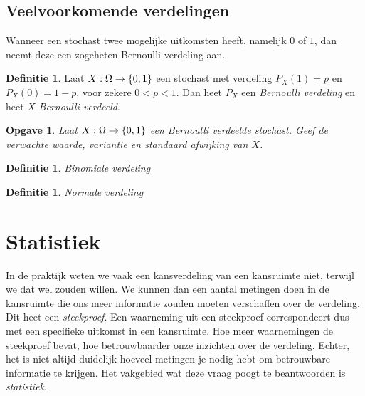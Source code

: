 \documentclass[a4paper]{book}
\newtheorem{exercise}[theorem]{Opgave}
\theoremstyle{definition}
\newtheorem{definition}[theorem]{Definitie}
\begin{document}
\section{Veelvoorkomende verdelingen}
Wanneer een stochast twee mogelijke uitkomsten heeft, namelijk $0$ of $1$, dan neemt deze een zogeheten Bernoulli verdeling aan.

\begin{definition}
    Laat $X : \Omega \to \set{0,1}$ een stochast met verdeling
    $P_X(1) = p$ en $P_X(0) = 1 - p$, voor zekere $0 < p < 1$.
    Dan heet $P_X$ een \emph{Bernoulli verdeling} en heet $X$ \emph{Bernoulli verdeeld}.
\end{definition}

\begin{exercise}
    Laat $X : \Omega \to \set{0,1}$ een Bernoulli verdeelde stochast.
    Geef de verwachte waarde, variantie en standaard afwijking van $X$.
\end{exercise}

\begin{definition}
    \emph{Binomiale verdeling}
\end{definition}

\begin{definition}
    \emph{Normale verdeling}
\end{definition}

\chapter{Statistiek}

In de praktijk weten we vaak een kansverdeling van een kansruimte niet, terwijl we dat wel zouden willen.
We kunnen dan een aantal metingen doen in de kansruimte die ons meer informatie zouden moeten verschaffen over de verdeling.
Dit heet een \emph{steekproef}.
Een waarneming uit een steekproef correspondeert dus met een specifieke uitkomst in een kansruimte.
Hoe meer waarnemingen de steekproef bevat, hoe betrouwbaarder onze inzichten over de verdeling.
Echter, het is niet altijd duidelijk hoeveel metingen je nodig hebt om betrouwbare informatie te krijgen.
Het vakgebied wat deze vraag poogt te beantwoorden is \emph{statistiek}.
\end{document}
